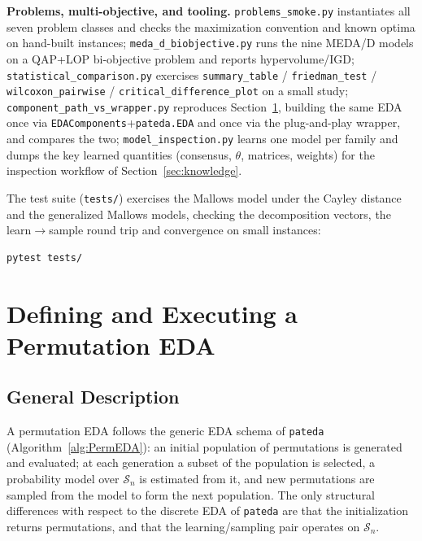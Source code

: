 \documentclass[a4paper,11pt]{article}
\begin{document}
\noindent \textbf{Problems, multi-objective, and tooling.}
\texttt{problems\_smoke.py} instantiates all seven problem classes and checks
the maximization convention and known optima on hand-built instances;
\texttt{meda\_d\_biobjective.py} runs the nine MEDA/D models on a QAP+LOP
bi-objective problem and reports hypervolume/IGD;
\texttt{statistical\_comparison.py} exercises \texttt{summary\_table} /
\texttt{friedman\_test} / \texttt{wilcoxon\_pairwise} /
\texttt{critical\_difference\_plot} on a small study;
\texttt{component\_path\_vs\_wrapper.py} reproduces
Section~\ref{sec:eda}, building the same EDA once via
\texttt{EDAComponents}+\texttt{pateda.EDA} and once via the plug-and-play
wrapper, and compares the two; \texttt{model\_inspection.py} learns one model
per family and dumps the key learned quantities (consensus, $\theta$,
matrices, weights) for the inspection workflow of Section~\ref{sec:knowledge}.

\noindent The test suite (\texttt{tests/}) exercises the Mallows model under the
Cayley distance and the generalized Mallows models, checking the decomposition
vectors, the learn$\rightarrow$sample round trip and convergence on small
instances:

\begin{lstlisting}[language=bash]
pytest tests/
\end{lstlisting}

\section{Defining and Executing a Permutation EDA}
\label{sec:eda}

\subsection{General Description}

A permutation EDA follows the generic EDA schema of \texttt{pateda}
(Algorithm~\ref{alg:PermEDA}): an initial population of permutations is generated
and evaluated; at each generation a subset of the population is selected, a
probability model over $\mathcal{S}_n$ is estimated from it, and new permutations
are sampled from the model to form the next population.  The only structural
differences with respect to the discrete EDA of \texttt{pateda} are that the
initialization returns permutations, and that the learning/sampling pair operates
on $\mathcal{S}_n$.
\end{document}
